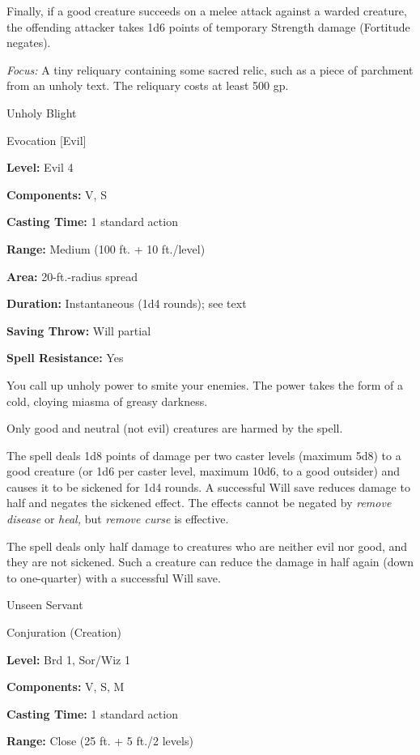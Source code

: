 \documentclass{article}
\begin{document}
Finally, if a good creature succeeds on a melee attack against a warded creature, 
the offending attacker takes 1d6 points of temporary Strength damage (Fortitude 
negates).

\textit{Focus: }A tiny reliquary containing some sacred relic, such as a piece 
of parchment from an unholy text. The reliquary costs at least 500 gp.

\vspace{12pt}
Unholy Blight

Evocation [Evil]

\textbf{Level:} Evil 4

\textbf{Components:} V, S

\textbf{Casting Time:} 1 standard action

\textbf{Range: }Medium (100 ft. + 10 ft./level)

\textbf{Area:} 20-ft.-radius spread

\textbf{Duration:} Instantaneous (1d4 rounds); see text

\textbf{Saving Throw: }Will partial

\textbf{Spell Resistance:} Yes

You call up unholy power to smite your enemies. The power takes the form of a cold, 
cloying miasma of greasy darkness.

Only good and neutral (not evil) creatures are harmed by the spell.

The spell deals 1d8 points of damage per two caster levels (maximum 5d8) to a good 
creature (or 1d6 per caster level, maximum 10d6, to a good outsider) and causes 
it to be sickened for 1d4 rounds. A successful Will save reduces damage to half 
and negates the sickened effect. The effects cannot be negated by \textit{remove 
disease }or \textit{heal, }but \textit{remove curse }is effective.

The spell deals only half damage to creatures who are neither evil nor good, and 
they are not sickened. Such a creature can reduce the damage in half again (down 
to one-quarter) with a successful Will save.

\vspace{12pt}
Unseen Servant

Conjuration (Creation)

\textbf{Level:} Brd 1, Sor/Wiz 1

\textbf{Components:} V, S, M

\textbf{Casting Time:} 1 standard action

\textbf{Range:} Close (25 ft. + 5 ft./2 levels)
\end{document}
